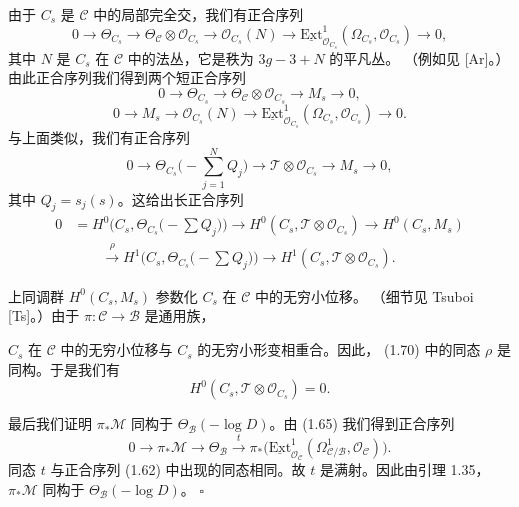 由于 $C_s$ 是 $\mathcal{C}$ 中的局部完全交，我们有正合序列
\[
0\to\Theta_{C_s}\to\Theta_{\mathcal{C}}\otimes\mathcal{O}_{C_s}
\to\mathcal{O}_{C_s}(N)\to\underline{\mathrm{Ext}}^1_{\mathcal{O}_{C_s}}
(\Omega_{C_s},\mathcal{O}_{C_s})\to 0,
\]
其中 $N$ 是 $C_s$ 在 $\mathcal{C}$ 中的法丛，它是秩为 $3g-3+N$ 的平凡丛。
（例如见 [Ar]。）由此正合序列我们得到两个短正合序列
\[
0\to\Theta_{C_s}\to\Theta_{\mathcal{C}}\otimes\mathcal{O}_{C_s}
\to M_s\to 0,
\]
\[
0\to M_s\to\mathcal{O}_{C_s}(N)\to\underline{\mathrm{Ext}}^1_{\mathcal{O}_{C_s}}
(\Omega_{C_s},\mathcal{O}_{C_s})\to 0.
\]
与上面类似，我们有正合序列
\[
0\to\Theta_{C_s}\Big(-\sum_{j=1}^{N}Q_j\Big)
\to\mathcal{T}\otimes\mathcal{O}_{C_s}\to M_s\to 0,
\]
其中 $Q_j=s_j(s)$。这给出长正合序列
\begin{align}
0&=H^0\Big(C_s,\Theta_{C_s}\Big(-\sum Q_j\Big)\Big)
\to H^0(C_s,\mathcal{T}\otimes\mathcal{O}_{C_s})\to H^0(C_s,M_s)
\tag{1.70}\\
&\qquad\xrightarrow{\ \rho\ }H^1\Big(C_s,\Theta_{C_s}
\Big(-\sum Q_j\Big)\Big)\to H^1(C_s,\mathcal{T}\otimes\mathcal{O}_{C_s}).
\nonumber
\end{align}

上同调群 $H^0(C_s,M_s)$ 参数化 $C_s$ 在 $\mathcal{C}$ 中的无穷小位移。
（细节见 Tsuboi [Ts]。）由于 $\pi:\mathcal{C}\to\mathcal{B}$ 是通用族，

$C_s$ 在 $\mathcal{C}$ 中的无穷小位移与 $C_s$ 的无穷小形变相重合。因此，
(1.70) 中的同态 $\rho$ 是同构。于是我们有
\[
H^0(C_s,\mathcal{T}\otimes\mathcal{O}_{C_s})=0.
\]

最后我们证明 $\pi_*\mathcal{M}$ 同构于
$\Theta_{\mathcal{B}}(-\log D)$。由 (1.65) 我们得到正合序列
\[
0\to\pi_*\mathcal{M}\to\Theta_{\mathcal{B}}
\xrightarrow{\ t\ }\pi_*\big(\underline{\mathrm{Ext}}^1_{\mathcal{O}_{\mathcal{C}}}
(\Omega^1_{\mathcal{C}/\mathcal{B}},\mathcal{O}_{\mathcal{C}})\big).
\]
同态 $t$ 与正合序列 (1.62) 中出现的同态相同。故 $t$ 是满射。因此由引理
1.35，$\pi_*\mathcal{M}$ 同构于 $\Theta_{\mathcal{B}}(-\log D)$。
\hfill$\square$

